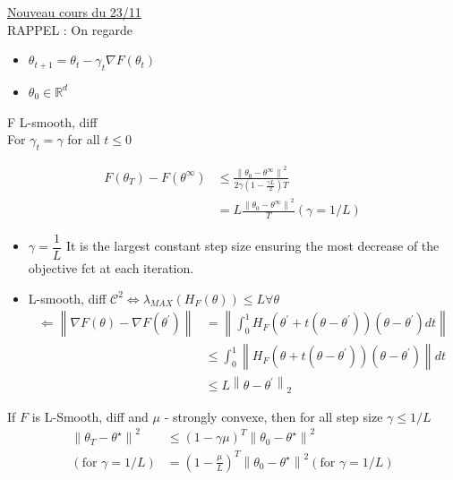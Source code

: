 \underline{Nouveau cours du 23/11} \\


RAPPEL : 
On regarde \begin{itemize}
    \item $ \theta _{t+1} = \theta _t - \gamma _t \nabla F(\theta _t)$ 
    \item $ \theta _0 \in \mathbb{R}^d $ 
\end{itemize}

\begin{thm}[]
    F L-smooth, diff \\
    For $\gamma_t = \gamma$ for all $t \leq0$
    
    \begin{align*}
        F(\theta _T) - F(\theta ^\infty ) 
            &\leq \frac{\left\| \theta _0 - \theta ^\infty \right\| ^2}{2 \gamma (1 - \frac{\gamma L}{2} )T} \\
            &= L \frac{\left\| \theta _0 - \theta ^\infty  \right\| ^2 }{T} (\gamma = 1/L)
    \end{align*}


    \begin{itemize}
        \item $\gamma = \dfrac{1}{L}$ It is the largest constant step size ensuring the most decrease of the objective fct at each iteration.
        \item L-smooth, diff $\mathcal{C}^2 \Leftrightarrow \lambda_{MAX}(H_F(\theta)) \leq L \forall \theta $
        \begin{align*}
            \Leftarrow  \left\| \nabla F(\theta ) - \nabla F(\theta ^\prime ) \right\|  
                &= \left\| \int_{0}^{1} H_F (\theta ^\prime + t ( \theta  - \theta ^\prime )) (\theta  - \theta ^\prime ) dt \right\| \\
                &\leq \int_{0}^{1} \left\| H_F (\theta  + t (\theta  - \theta ^\prime )) (\theta  - \theta ^\prime ) \right\| dt \\
                &\leq L \left\| \theta - \theta ^\prime  \right\| _2
        \end{align*}
    \end{itemize}
\end{thm}

\begin{thm}[]
    If $ F $ is L-Smooth, diff and $ \mu  $ - strongly convexe, then for all step size $ \gamma \leq 1/L $ 
    \begin{align*}
        \left\| \theta _T - \theta ^\star  \right\| ^2 
            &\leq (1 - \gamma \mu ) ^T \left\| \theta _0 - \theta ^\star  \right\| ^2 \\
            (\text{for } \gamma = 1/L) &= (1 - \frac{\mu }{L}) ^T \left\| \theta _0 - \theta ^\star  \right\| ^2 (\text{for } \gamma = 1/L)
    \end{align*}
\end{thm}

